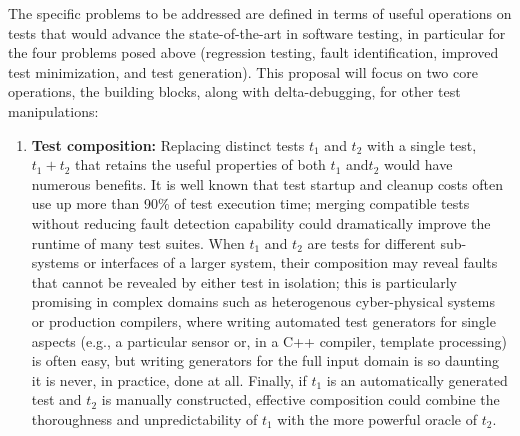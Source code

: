 The specific problems to be addressed are defined in terms of useful
operations on tests that would advance the state-of-the-art in
software testing, in particular for the four problems posed above
(regression testing, fault identification, improved test minimization,
and test generation).  This proposal will focus on two core
operations, the building blocks, along with delta-debugging, for other
test manipulations:

\begin{enumerate}
\item {\bf Test composition:} Replacing distinct tests $t_1$ and $t_2$
  with a single test, $t_1+t_2$ that retains the useful properties of
  both $t_1$ and$t_2$ would have numerous benefits.  It is well known
  \cite{KaiserBell} that test startup and cleanup costs often use up more than
  90\% of test execution time; merging compatible tests without
  reducing fault detection capability could dramatically improve the
  runtime of many test suites.  When $t_1$ and $t_2$ are tests for
  different sub-systems or interfaces of a larger system, their composition may
  reveal faults that cannot be revealed by either test in isolation;
  this is particularly promising in complex domains such as heterogenous
  cyber-physical systems or production compilers, where writing automated test generators
  for single aspects (e.g., a particular sensor or, in a C++ compiler, template processing) is
  often easy, but writing generators for the full input domain
  is so daunting it is never, in practice, done at all.
  Finally, if $t_1$ is an automatically generated test and $t_2$ is
  manually constructed, effective composition could combine the
  thoroughness and unpredictability of $t_1$ with the more powerful
  oracle \cite{oracleMcMinn} of $t_2$.  


\end{enumerate}
